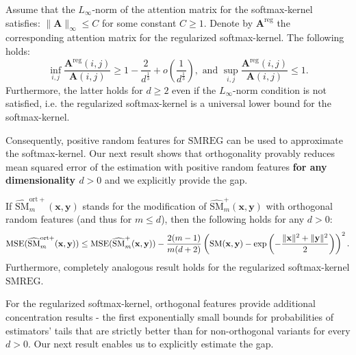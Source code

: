\begin{theorem}
\label{reg-theorem}
Assume that the $L_{\infty}$-norm of the attention matrix for the softmax-kernel satisfies: $\|\mathbf{A}\|_{\infty} \leq C$ for some constant $C \geq 1$. Denote by $\mathbf{A}^{\mathrm{reg}}$ the corresponding attention matrix for the regularized softmax-kernel. The following holds:
\begin{equation}
\inf_{i,j} \frac{\mathbf{A}^{\mathrm{reg}}(i,j)}{\mathbf{A}(i, j)} \geq 1 - \frac{2}{d^{\frac{1}{3}}} + o\left(\frac{1}{d^{\frac{1}{3}}}\right), \textrm{ and } \sup_{i,j} \frac{\mathbf{A}^{\mathrm{reg}}(i,j)}{\mathbf{A}(i, j)} \leq 1. 
\end{equation}
Furthermore, the latter holds for $d \geq 2$ even if the $L_{\infty}$-norm condition is not satisfied, i.e. the regularized softmax-kernel is a universal lower bound for the softmax-kernel. 
\end{theorem}
Consequently, positive random features for $\mathrm{SMREG}$ can be used to approximate the softmax-kernel.
Our next result shows that orthogonality provably reduces mean squared error of the estimation with positive random features \textbf{for any dimensionality $d>0$} and we explicitly provide the gap.
\begin{theorem}
\label{var-theorem}
If $\widehat{\mathrm{SM}}_{m}^{\mathrm{ort+}}(\mathbf{x}, \mathbf{y})$ stands for the modification of
$\widehat{\mathrm{SM}}_{m}^{+}(\mathbf{x}, \mathbf{y})$ with orthogonal random features (and thus for $m \leq d$), then the following holds for any $d >0$:
\begin{equation}
\mathrm{MSE}(\widehat{\mathrm{SM}}_{m}^{\mathrm{ort+}}(\mathbf{x}, \mathbf{y})) \leq 
\mathrm{MSE}(\widehat{\mathrm{SM}}_{m}^{+}(\mathbf{x}, \mathbf{y})) - \frac{2 (m - 1)}{m(d+2)}\left(\mathrm{SM}(\mathbf{x}, \mathbf{y}) - \exp\left(- \frac{\| \mathbf{x} \|^2 + \| \mathbf{y} \|^2}{2}\right) \right)^2.
\end{equation}
Furthermore, completely analogous result holds for the regularized softmax-kernel $\mathrm{SMREG}$.
\end{theorem}
For the regularized softmax-kernel, orthogonal features provide additional concentration results - the first exponentially small bounds for probabilities of estimators' tails that are strictly better than for non-orthogonal variants for every $d>0$. Our next result enables us to explicitly estimate the gap.

